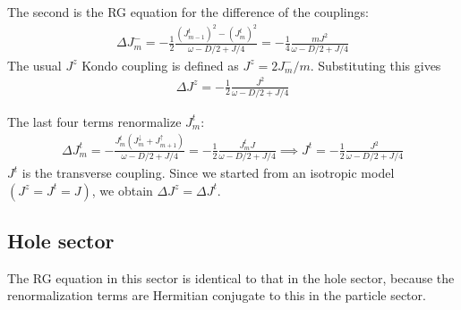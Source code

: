 \documentclass[12pt]{revtex4-2}
\begin{document}
The second is the RG equation for the difference of the couplings:
\begin{equation}\begin{aligned}
	\Delta J^-_m = -\frac{1}{2}\frac{\left( J^t_{m-1} \right) ^2 - \left(J^t_{m}\right) ^2}{\omega - D/2 + J/4} = -\frac{1}{4}\frac{m J^2}{\omega - D/2 + J/4}
\end{aligned}\end{equation}
The usual \(J^z\) Kondo coupling is defined as \(J^z = 2J^-_m/m\). Substituting this gives 
\begin{equation}\begin{aligned}
	\Delta J^z = -\frac{1}{2}\frac{J^2}{\omega - D/2 + J/4}
\end{aligned}\end{equation}

The last four terms renormalize \(J^t_m\):
\begin{equation}\begin{aligned}
	\Delta J^t_m = - \frac{J^t_m \left( J^\downarrow_m + J^\uparrow_{m+1} \right) }{\omega - D/2 + J/4} = -\frac{1}{2}\frac{J^t_m J}{\omega - D/2 + J/4} \implies J^t = -\frac{1}{2}\frac{J^2}{\omega - D/2 + J/4}
\end{aligned}\end{equation}
\(J^t\) is the transverse coupling. Since we started from an isotropic model \(\left( J^z = J^t= J \right) \), we obtain \(\Delta J^z = \Delta J^t\).

\subsection{Hole sector}
The RG equation in this sector is identical to that in the hole sector, because the renormalization terms are Hermitian conjugate to this in the particle sector.



\end{document}
